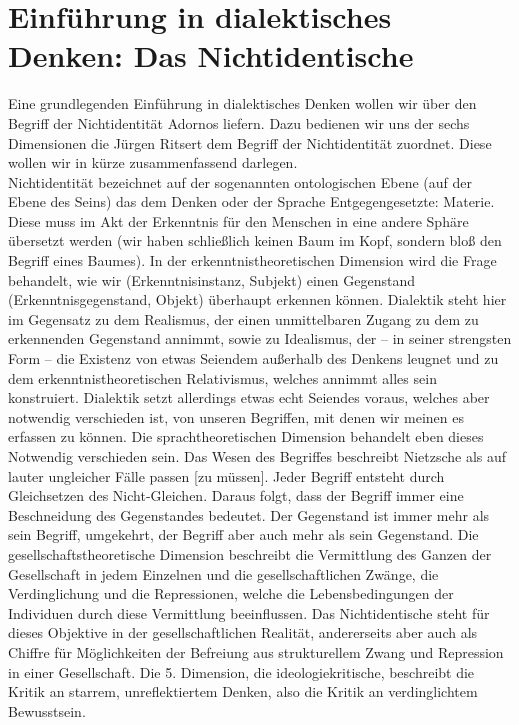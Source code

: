 \documentclass[12pt, a4paper, openany]{report}
\begin{document}
\section{Einführung in dialektisches Denken: Das Nichtidentische}
Eine grundlegenden Einführung in dialektisches Denken wollen wir über den Begriff der Nichtidentität Adornos liefern. 
Dazu bedienen wir uns der sechs Dimensionen die Jürgen Ritsert dem Begriff der Nichtidentität zuordnet. 
Diese wollen wir in kürze zusammenfassend darlegen. \\
Nichtidentität bezeichnet auf der sogenannten ontologischen Ebene (auf der Ebene des Seins) das dem Denken oder der Sprache Entgegengesetzte: Materie. 
Diese muss im Akt der Erkenntnis für den Menschen in eine andere Sphäre übersetzt werden (wir haben schließlich keinen Baum im Kopf, sondern bloß den Begriff eines Baumes). 
In der erkenntnistheoretischen Dimension wird die Frage behandelt, wie wir (Erkenntnisinstanz, Subjekt) einen Gegenstand (Erkenntnisgegenstand, Objekt) überhaupt erkennen können. 
Dialektik steht hier im Gegensatz zu dem Realismus, der einen unmittelbaren Zugang zu dem zu erkennenden Gegenstand annimmt, sowie zu Idealismus, der – in seiner strengsten Form – die Existenz von etwas Seiendem außerhalb des Denkens leugnet und zu dem erkenntnistheoretischen Relativismus, welches annimmt alles sein konstruiert. 
Dialektik setzt allerdings etwas echt Seiendes voraus, welches aber notwendig verschieden ist, von unseren Begriffen, mit denen wir meinen es erfassen zu können. 
Die sprachtheoretischen Dimension behandelt eben dieses Notwendig verschieden sein. 
Das Wesen des Begriffes beschreibt Nietzsche als \glqq auf lauter ungleicher Fälle passen [zu müssen]. Jeder Begriff entsteht durch Gleichsetzen des Nicht-Gleichen\grqq. 
Daraus folgt, dass der Begriff immer eine Beschneidung des Gegenstandes bedeutet. Der Gegenstand ist immer mehr als sein Begriff, umgekehrt, der Begriff aber auch mehr als sein Gegenstand. 
Die gesellschaftstheoretische Dimension beschreibt die Vermittlung des Ganzen der Gesellschaft in jedem Einzelnen und die gesellschaftlichen Zwänge, die Verdinglichung und die Repressionen, welche die Lebensbedingungen der Individuen durch diese Vermittlung beeinflussen. 
Das Nichtidentische steht für dieses Objektive in der gesellschaftlichen Realität, andererseits aber auch \glqq als Chiffre für Möglichkeiten der Befreiung aus strukturellem Zwang und Repression in einer Gesellschaft\grqq. 
Die 5. Dimension, die ideologiekritische, beschreibt die Kritik an starrem, unreflektiertem Denken, also die Kritik an verdinglichtem Bewusstsein. 
\end{document}
